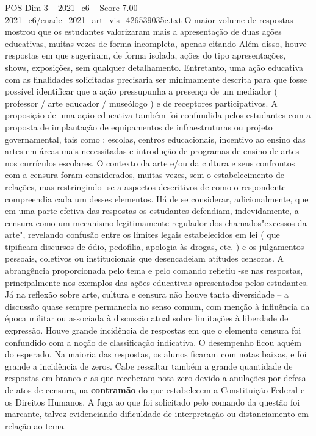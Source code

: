 \begin{textsample}{POS Dim 3 – 2021\_c6 – Score 7.00 – 2021\_c6/enade\_2021\_art\_vis\_426539035c.txt}
O maior volume de respostas mostrou que os estudantes valorizaram mais a apresentação de duas ações educativas, muitas vezes de forma incompleta, apenas citando Além disso, houve respostas em que sugeriram, de forma isolada, ações do tipo apresentações, shows, exposições, sem qualquer detalhamento.
Entretanto, uma ação educativa com as finalidades solicitadas precisaria ser minimamente descrita para que fosse possível identificar que a ação pressupunha a presença de um mediador ( professor / arte educador / museólogo ) e de receptores participativos.
A proposição de uma ação educativa também foi confundida pelos estudantes com a proposta de implantação de equipamentos de infraestruturas ou projeto governamental, tais como : escolas, centros educacionais, incentivo ao ensino das artes em áreas mais necessitadas e introdução de programas de ensino de artes nos currículos escolares.
O contexto da arte e/ou da cultura e seus confrontos com a censura foram considerados, muitas vezes, sem o estabelecimento de relações, mas restringindo -se a aspectos descritivos de como o respondente compreendia cada um desses elementos.
Há de se considerar, adicionalmente, que em uma parte efetiva das respostas os estudantes defendiam, indevidamente, a censura como um mecanismo legitimamente regulador dos chamados"excessos da arte", revelando confusão entre os limites legais estabelecidos em lei ( que tipificam discursos de ódio, pedofilia, apologia às drogas, etc. ) e os julgamentos pessoais, coletivos ou institucionais que desencadeiam atitudes censoras.
A abrangência proporcionada pelo tema e pelo comando refletiu -se nas respostas, principalmente nos exemplos das ações educativas apresentados pelos estudantes.
Já na reflexão sobre arte, cultura e censura não houve tanta diversidade – a discussão quase sempre permanecia no senso comum, com menção à influência da época militar ou associada à discussão atual sobre limitações à liberdade de expressão.
Houve grande incidência de respostas em que o elemento censura foi confundido com a noção de classificação indicativa.
O desempenho ficou aquém do esperado.
Na maioria das respostas, os alunos ficaram com notas baixas, e foi grande a incidência de zeros.
Cabe ressaltar também a grande quantidade de respostas em branco e as que receberam nota zero devido a anulações por defesa de atos de censura, na \textbf{contramão} do que estabelecem a Constituição Federal e os Direitos Humanos.
A fuga ao que foi solicitado pelo comando da questão foi marcante, talvez evidenciando dificuldade de interpretação ou distanciamento em relação ao tema.

\end{textsample}
